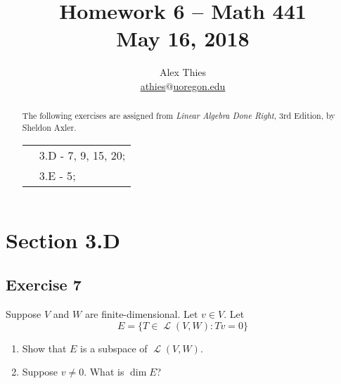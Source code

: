 \documentclass[letterpaper, 12pt]{amsart}
\DeclareMathOperator{\Ell}{\mathscr{L}}				%
\theoremstyle{definition}  							%
\begin{document}
	\title{Homework 6  -- Math 441 \\ M\lowercase{ay 16, 2018}}
	\author{Alex Thies \\ \href{mailto:athies@uoregon.edu}{\lowercase{athies$@$uoregon.edu}}}

	\begin{abstract}
	The following exercises are assigned from \textit{Linear Algebra Done Right}, 3rd Edition, by Sheldon Axler. 
			\begin{tabular}{rl}
				& 3.D - 7, 9, 15, 20; \\
				& 3.E - 5;
			\end{tabular}
	\end{abstract}

	\maketitle

	\section*{Section 3.D}
		\subsection*{Exercise 7}
		Suppose $V$ and $W$ are finite-dimensional. 
		Let $v \in V$. 
		Let $$E = \{ T \in \Ell(V,W) : Tv = 0 \}$$
		\begin{enumerate}[\hspace{5mm} (a)]
			\item Show that $E$ is a subspace of $\Ell(V,W)$.
			\item Suppose $v \neq 0$. What is $\dim E$?
		\end{enumerate}
		
\end{document}
